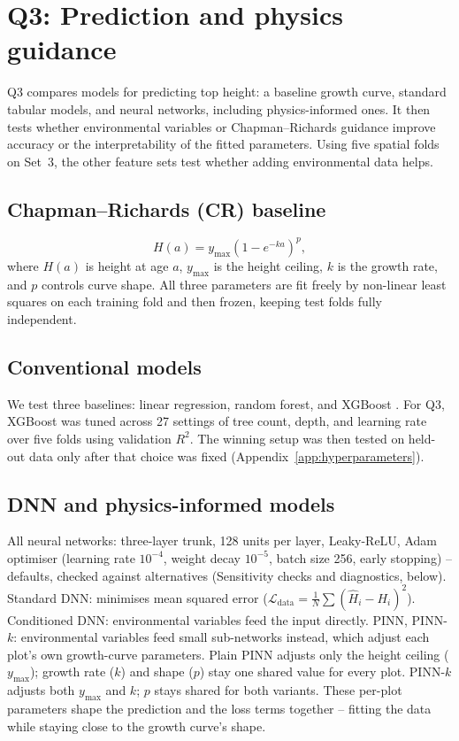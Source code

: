 \section{Q3: Prediction and physics guidance}

Q3 compares models for predicting top height: a baseline growth curve, standard tabular models, and neural networks, including physics-informed ones. It then tests whether environmental variables or Chapman--Richards guidance improve accuracy or the interpretability of the fitted parameters. Using five spatial folds on Set~3, the other feature sets test whether adding environmental data helps.

\subsection{Chapman--Richards (CR) baseline}
\begin{equation}
H(a) = y_{\max}\left(1 - e^{-ka}\right)^p,
\label{eq:cr}
\end{equation}
where $H(a)$ is height at age $a$, $y_{\max}$ is the height ceiling, $k$ is the growth rate, and $p$ controls curve shape. All three parameters are fit freely by non-linear least squares on each training fold and then frozen, keeping test folds fully independent.

\subsection*{Conventional models}
We test three baselines: linear regression, random forest, and XGBoost \cite{chen2016XGBoost_C4_NN}. For Q3, XGBoost was tuned across 27 settings of tree count, depth, and learning rate over five folds using validation $R^2$. The winning setup was then tested on held-out data only after that choice was fixed (Appendix~\ref{app:hyperparameters}).

\subsection{DNN and physics-informed models}
All neural networks: three-layer trunk, 128 units per layer, Leaky-ReLU, Adam optimiser (learning rate $10^{-4}$, weight decay $10^{-5}$, batch size 256, early stopping) -- defaults, checked against alternatives (Sensitivity checks and diagnostics, below). Standard DNN: minimises mean squared error ($\mathcal{L}_{\mathrm{data}} = \frac{1}{N}\sum (\hat H_i-H_i)^2$). Conditioned DNN: environmental variables feed the input directly. PINN, PINN-$k$: environmental variables feed small sub-networks instead, which adjust each plot's own growth-curve parameters. Plain PINN adjusts only the height ceiling ($y_{\max}$); growth rate ($k$) and shape ($p$) stay one shared value for every plot. PINN-$k$ adjusts both $y_{\max}$ and $k$; $p$ stays shared for both variants. These per-plot parameters shape the prediction and the loss terms together -- fitting the data while staying close to the growth curve's shape.

